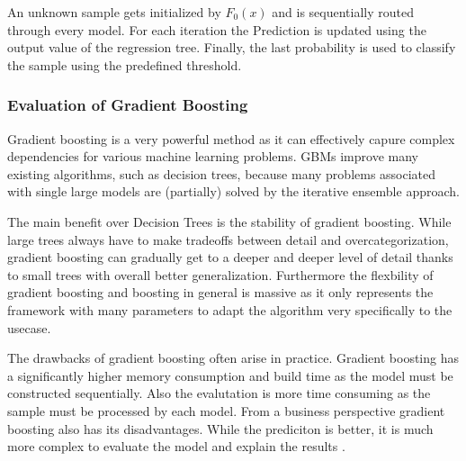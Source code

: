 An unknown sample gets initialized by \(F_{0}(x)\) and is sequentially routed through every model. For each iteration the 
Prediction is updated using the output value of the regression tree. Finally, the last probability is used to classify 
the sample using the predefined threshold. 

\subsubsection{Evaluation of Gradient Boosting}

Gradient boosting is a very powerful method as it can effectively capure complex dependencies for various machine 
learning problems. \ac{GBM}s improve many existing algorithms, such as decision trees, because many problems associated 
with single large models are (partially) solved by the iterative ensemble approach. 

The main benefit over Decision Trees is the stability of gradient boosting. While large trees always have to make tradeoffs 
between detail and overcategorization, gradient boosting can gradually get to a deeper and deeper level of detail thanks to 
small trees with overall better generalization. Furthermore the flexbility of gradient boosting and boosting in general is massive 
as it only represents the framework with many parameters to adapt the algorithm very specifically to the usecase.  

The drawbacks of gradient boosting often arise in practice. Gradient boosting has a significantly higher memory consumption and 
build time as the model must be constructed sequentially. Also the evalutation is more time consuming as the sample must be processed 
by each model. From a business perspective gradient boosting also has its disadvantages. While the prediciton is better, it is much 
more complex to evaluate the model and explain the results \cite[7.2]{Natekin2013}. 